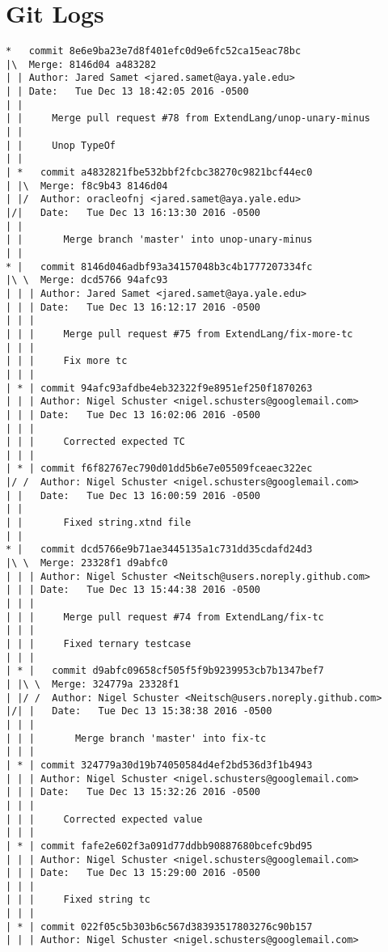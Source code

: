 \medskip \noindent
\chapter{Git Logs}
\begin{lstlisting}
*   commit 8e6e9ba23e7d8f401efc0d9e6fc52ca15eac78bc
|\  Merge: 8146d04 a483282
| | Author: Jared Samet <jared.samet@aya.yale.edu>
| | Date:   Tue Dec 13 18:42:05 2016 -0500
| | 
| |     Merge pull request #78 from ExtendLang/unop-unary-minus
| |     
| |     Unop TypeOf
| |     
| *   commit a4832821fbe532bbf2fcbc38270c9821bcf44ec0
| |\  Merge: f8c9b43 8146d04
| |/  Author: oracleofnj <jared.samet@aya.yale.edu>
|/|   Date:   Tue Dec 13 16:13:30 2016 -0500
| |   
| |       Merge branch 'master' into unop-unary-minus
| |     
* |   commit 8146d046adbf93a34157048b3c4b1777207334fc
|\ \  Merge: dcd5766 94afc93
| | | Author: Jared Samet <jared.samet@aya.yale.edu>
| | | Date:   Tue Dec 13 16:12:17 2016 -0500
| | | 
| | |     Merge pull request #75 from ExtendLang/fix-more-tc
| | |     
| | |     Fix more tc
| | |    
| * | commit 94afc93afdbe4eb32322f9e8951ef250f1870263
| | | Author: Nigel Schuster <nigel.schusters@googlemail.com>
| | | Date:   Tue Dec 13 16:02:06 2016 -0500
| | | 
| | |     Corrected expected TC
| | |    
| * | commit f6f82767ec790d01dd5b6e7e05509fceaec322ec
|/ /  Author: Nigel Schuster <nigel.schusters@googlemail.com>
| |   Date:   Tue Dec 13 16:00:59 2016 -0500
| |   
| |       Fixed string.xtnd file
| |     
* |   commit dcd5766e9b71ae3445135a1c731dd35cdafd24d3
|\ \  Merge: 23328f1 d9abfc0
| | | Author: Nigel Schuster <Neitsch@users.noreply.github.com>
| | | Date:   Tue Dec 13 15:44:38 2016 -0500
| | | 
| | |     Merge pull request #74 from ExtendLang/fix-tc
| | |     
| | |     Fixed ternary testcase
| | |      
| * |   commit d9abfc09658cf505f5f9b9239953cb7b1347bef7
| |\ \  Merge: 324779a 23328f1
| |/ /  Author: Nigel Schuster <Neitsch@users.noreply.github.com>
|/| |   Date:   Tue Dec 13 15:38:38 2016 -0500
| | |   
| | |       Merge branch 'master' into fix-tc
| | |    
| * | commit 324779a30d19b74050584d4ef2bd536d3f1b4943
| | | Author: Nigel Schuster <nigel.schusters@googlemail.com>
| | | Date:   Tue Dec 13 15:32:26 2016 -0500
| | | 
| | |     Corrected expected value
| | |    
| * | commit fafe2e602f3a091d77ddbb90887680bcefc9bd95
| | | Author: Nigel Schuster <nigel.schusters@googlemail.com>
| | | Date:   Tue Dec 13 15:29:00 2016 -0500
| | | 
| | |     Fixed string tc
| | |    
| * | commit 022f05c5b303b6c567d38393517803276c90b157
| | | Author: Nigel Schuster <nigel.schusters@googlemail.com>

\end{lstlisting}
